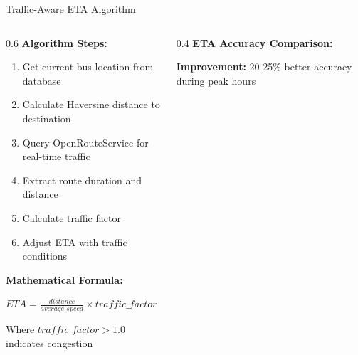 \documentclass[aspectratio=169]{beamer}
\begin{document}
\begin{frame}{Traffic-Aware ETA Algorithm}
    \begin{columns}
        \begin{column}{0.6\textwidth}
            \textbf{Algorithm Steps:}
            \begin{enumerate}
                \item Get current bus location from database
                \item Calculate Haversine distance to destination
                \item Query OpenRouteService for real-time traffic
                \item Extract route duration and distance
                \item Calculate traffic factor
                \item Adjust ETA with traffic conditions
            \end{enumerate}
            
            \vspace{0.3cm}
            \textbf{Mathematical Formula:}
            \begin{block}{}
                \centering
                $ETA = \frac{distance}{average\_speed} \times traffic\_factor$
                
                Where $traffic\_factor > 1.0$ indicates congestion
            \end{block}
        \end{column}
        \begin{column}{0.4\textwidth}
            \textbf{ETA Accuracy Comparison:}
            
            \textbf{Improvement:} 20-25\% better accuracy during peak hours
        \end{column}
    \end{columns}
\end{frame}
\end{document}
